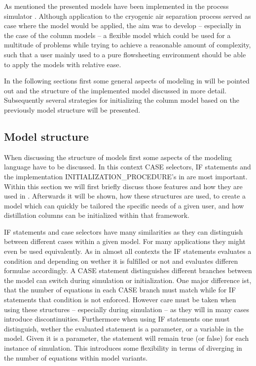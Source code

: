 ﻿As mentioned the presented models have been implemented in the process simulator \gproms. Although application
to the cryogenic air separation process served as case where the model would be applied, the aim was to develop
-- especially in the case of the column models -- a flexible model which could be used for a multitude of
problems while trying to achieve a reasonable amount of complexity, such that a user mainly used to a pure flowsheeting
environment should be able to apply the models with relative ease.

In the following sections first some general aspects of modeling in \gproms will be pointed out and the structure
of the implemented model discussed in more detail. Subsequently several strategies for initializing the column model
based on the previously model structure will be presented.

\subsection{Model structure}
\label{sec:mathpro:implementation:modelstructure}

    When discussing the structure of \gproms models first some aspects of the modeling language have to be discussed.
    In this context CASE selectors, IF statements and the implementation INITIALIZATION\_PROCEDURE's in \gproms are most
    important. Within this section we will first briefly discuss those features and how they are used in \gproms.
    Afterwards it will be shown, how these structures are used, to create a model which can quickly be tailored the
    specific needs of a given user, and how distillation columns can be initialized within that framework.

    IF statements and case selectors have many similarities as they can distinguish between different cases within a
    given model. For many applications they might even be used equivalently. As in almost all contexts the IF statements
    evaluates a condition and depending on wether it is fulfilled or not and evaluates differen formulae accordingly.
    A  CASE statement distinguishes different branches between the model can switch during simulation or initialization.
    One major difference ist, that the number of equations in each CASE branch must match while for IF statements that
    condition is not enforced. However care must be taken when using these structures -- especially during simulation --
    as they will in many cases introduce discontinuities. Furthermore when using IF statements one must distinguish,
    wether the evaluated statement is a parameter, or a variable in the model. Given it is a parameter, the statement will
    remain true (or false) for each instance of simulation. This introduces some flexibility in terms of diverging
    in the number of equations within model variants.

